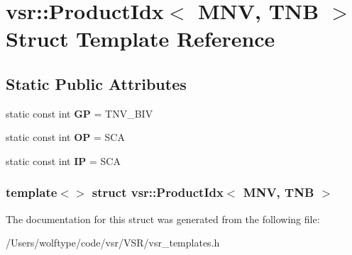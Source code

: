 \hypertarget{structvsr_1_1_product_idx_3_01_m_n_v_00_01_t_n_b_01_4}{\section{vsr\-:\-:Product\-Idx$<$ M\-N\-V, T\-N\-B $>$ Struct Template Reference}
\label{structvsr_1_1_product_idx_3_01_m_n_v_00_01_t_n_b_01_4}
}
\subsection*{Static Public Attributes}
\begin{DoxyCompactItemize}
\item 
\hypertarget{structvsr_1_1_product_idx_3_01_m_n_v_00_01_t_n_b_01_4_a01724d67ee0e729aff85d180660221dd}{static const int {\bfseries G\-P} = T\-N\-V\-\_\-\-B\-I\-V}\label{structvsr_1_1_product_idx_3_01_m_n_v_00_01_t_n_b_01_4_a01724d67ee0e729aff85d180660221dd}

\item 
\hypertarget{structvsr_1_1_product_idx_3_01_m_n_v_00_01_t_n_b_01_4_a5d04d92e2a0fa02b2779a52c232c50e7}{static const int {\bfseries O\-P} = S\-C\-A}\label{structvsr_1_1_product_idx_3_01_m_n_v_00_01_t_n_b_01_4_a5d04d92e2a0fa02b2779a52c232c50e7}

\item 
\hypertarget{structvsr_1_1_product_idx_3_01_m_n_v_00_01_t_n_b_01_4_a6867a1d48c4809e061e9c0923be90e34}{static const int {\bfseries I\-P} = S\-C\-A}\label{structvsr_1_1_product_idx_3_01_m_n_v_00_01_t_n_b_01_4_a6867a1d48c4809e061e9c0923be90e34}

\end{DoxyCompactItemize}
\subsubsection*{template$<$$>$ struct vsr\-::\-Product\-Idx$<$ M\-N\-V, T\-N\-B $>$}



The documentation for this struct was generated from the following file\-:\begin{DoxyCompactItemize}
\item 
/\-Users/wolftype/code/vsr/\-V\-S\-R/vsr\-\_\-templates.\-h\end{DoxyCompactItemize}
